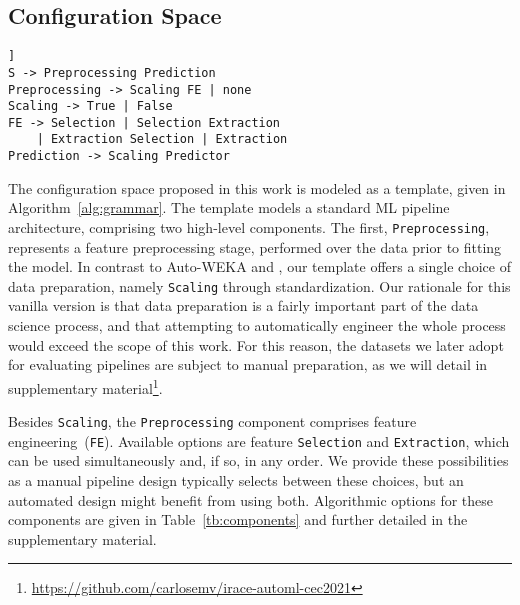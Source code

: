 \subsection{Configuration Space}

\begin{lstlisting}[caption={\small \smallisklearn template described as a grammar.}, label={alg:grammar},captionpos=b, float, basicstyle=\footnotesize\ttfamily]]
S -> Preprocessing Prediction
Preprocessing -> Scaling FE | none
Scaling -> True | False
FE -> Selection | Selection Extraction 
	| Extraction Selection | Extraction
Prediction -> Scaling Predictor
\end{lstlisting}

The configuration space proposed in this work is modeled as a template, given in Algorithm~\ref{alg:grammar}. The template models a standard ML pipeline architecture, comprising two high-level components. The first, \texttt{\small Preprocessing}, represents a feature preprocessing stage, performed over the data prior to fitting the model. In contrast to Auto-WEKA and \autosklearn, our template offers a single choice of data preparation, namely \texttt{\small Scaling} through standardization. Our rationale for this vanilla version is that data preparation is a fairly important part of the data science process, and that attempting to automatically engineer the whole process would exceed the scope of this work. For this reason, the datasets we later adopt for evaluating pipelines are subject to manual preparation, as we will detail in supplementary material\footnote{\url{https://github.com/carlosemv/irace-automl-cec2021}}. 


Besides \texttt{\small Scaling}, the \texttt{\small Preprocessing} component comprises feature engineering~(\texttt{\small FE}). Available options are feature \texttt{\small Selection} and \texttt{\small Extraction}, which can be used simultaneously and, if so, in any order. We provide these possibilities as a manual pipeline design typically selects between these choices, but an automated design might benefit from using both. Algorithmic options for these components  are given in Table~\ref{tb:components} and further detailed in the supplementary material.%

